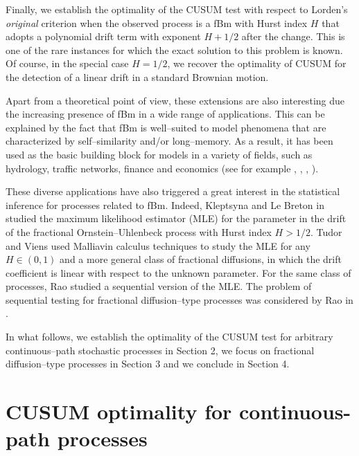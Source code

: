 \documentclass[11pt,reqno]{amsart}
\theoremstyle{remark}
\begin{document}
Finally, we establish the  optimality of the CUSUM test with respect to Lorden's \textit{original} criterion when the observed process is a 
fBm with Hurst index $H$ that adopts a polynomial drift term with exponent $H+1/2$ after the change. This is one of the rare instances for which the exact solution to this problem is known. Of course, in the special case $H=1/2$, we recover the  optimality of CUSUM for the detection 
of a linear drift in a  standard Brownian motion.

Apart from a theoretical point of view, these extensions are also interesting due the increasing presence of fBm in a wide range of applications. 
This  can be explained by the fact that fBm is well--suited to model phenomena that are characterized by self--similarity and/or long--memory. 
As a result, it has been used  as the basic building block for models in a variety of fields, such as hydrology, traffic networks, finance  and economics (see for example \cite{beran}, \cite{CV},  \cite{CR}, \cite{Hurst}). 

These diverse applications have also triggered a great interest in the statistical inference for  processes related to fBm. 
Indeed, Kleptsyna and Le Breton  in  \cite{KLB1} studied the maximum likelihood estimator  (MLE) for the parameter 
in the drift of the fractional Ornstein--Uhlenbeck  process with Hurst index $H>1/2$. 
Tudor and Viens \cite{TV} used Malliavin calculus techniques to study the MLE for any $H \in (0,1)$ and a more general class of fractional diffusions, 
in which the drift coefficient is linear with respect to the unknown parameter. For the same class of processes,  Rao \cite{raoestim} studied a sequential version of the MLE. The problem of sequential testing for fractional diffusion--type processes was considered by Rao in \cite{rao}. 

In what follows, we establish the optimality of the CUSUM test for arbitrary  continuous--path stochastic processes in Section 2,
we focus on fractional diffusion--type processes in  Section 3 and we conclude in Section 4.

\section{CUSUM optimality for continuous-path processes}
\end{document}
